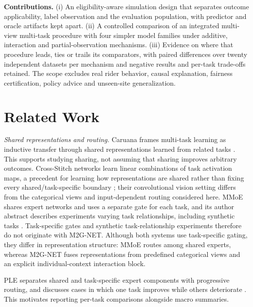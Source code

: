 \documentclass[9pt, conference, a4paper, compsocconf]{IEEEtran}
\begin{document}
\textbf{Contributions.} (i) An eligibility-aware simulation design that separates outcome applicability, label observation and the evaluation population, with predictor and oracle artifacts kept apart. (ii) A controlled comparison of an integrated multi-view multi-task procedure with four simpler model families under additive, interaction and partial-observation mechanisms. (iii) Evidence on where that procedure leads, ties or trails its comparators, with paired differences over twenty independent datasets per mechanism and negative results and per-task trade-offs retained. The scope excludes real rider behavior, causal explanation, fairness certification, policy advice and unseen-site generalization.

\section{Related Work}
\textit{Shared representations and routing.} Caruana frames multi-task learning as inductive transfer through shared representations learned from related tasks \cite{Caruana1997multitask}. This supports studying sharing, not assuming that sharing improves arbitrary outcomes. Cross-Stitch networks learn linear combinations of task activation maps, a precedent for learning how representations are shared rather than fixing every shared/task-specific boundary \cite{Misra2016cross}; their convolutional vision setting differs from the categorical views and input-dependent routing considered here. MMoE shares expert networks and uses a separate gate for each task, and its author abstract describes experiments varying task relationships, including synthetic tasks \cite{Ma2018modeling}. Task-specific gates and synthetic task-relationship experiments therefore do not originate with M2G-NET. Although both systems use task-specific gating, they differ in representation structure: MMoE routes among shared experts, whereas M2G-NET fuses representations from predefined categorical views and an explicit individual-context interaction block.

PLE separates shared and task-specific expert components with progressive routing, and discusses cases in which one task improves while others deteriorate \cite{Tang2020progressive}. This motivates reporting per-task comparisons alongside macro summaries.
\end{document}
